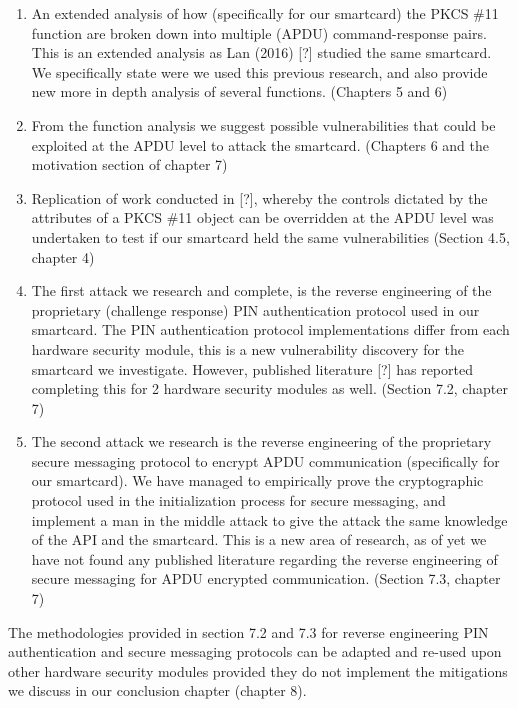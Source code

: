\documentclass[bsc,frontabs,twoside,singlespacing,parskip,deptreport]{infthesis}     %
\begin{document}
\begin{enumerate}
\item An extended analysis of how (specifically for our smartcard) the PKCS \#11 function are broken down into multiple (APDU) command-response pairs. This is an extended analysis as Lan (2016) [?] studied the same smartcard. We specifically state were we used this previous research, and also provide new more in depth analysis of several functions. (Chapters 5 and 6)

\item From the function analysis we suggest possible vulnerabilities that could be exploited at the APDU level to attack the smartcard. (Chapters 6 and the motivation section of chapter 7)

\item Replication of work conducted in [?], whereby the controls dictated by the attributes of a PKCS \#11 object can be overridden at the APDU level was undertaken to test if our smartcard held the same vulnerabilities (Section 4.5, chapter 4)

\item The first attack we research and complete, is the reverse engineering of the proprietary (challenge response) PIN authentication protocol used in our smartcard. The PIN authentication protocol implementations differ from each hardware security module, this is a new vulnerability discovery for the smartcard we investigate. However, published literature [?] has reported completing this for 2 hardware security modules as well. (Section 7.2, chapter 7)

\item The second attack we research is the reverse engineering of the proprietary secure messaging protocol to encrypt APDU communication (specifically for our smartcard). We have managed to empirically prove the cryptographic protocol used in the initialization process for secure messaging, and implement a man in the middle attack to give the attack the same knowledge of the API and the smartcard. This is a new area of research, as of yet we have not found any published literature regarding the reverse engineering of secure messaging for APDU encrypted communication. (Section 7.3, chapter 7)\\
\end{enumerate}


The methodologies provided in section 7.2 and 7.3 for reverse engineering PIN authentication and secure messaging protocols can be adapted and re-used upon other hardware security modules provided they do not implement the mitigations we discuss in our conclusion chapter (chapter 8).
\end{document}
